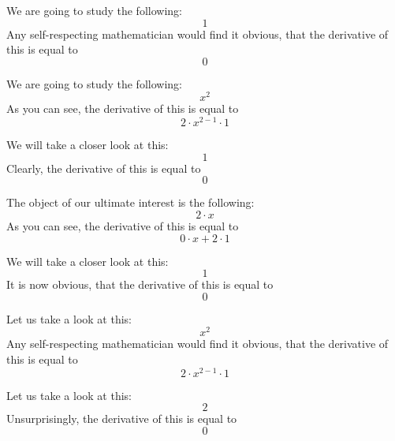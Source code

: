 \documentclass{article}
\begin{document}
We are going to study the following:
\begin{equation}
1 
\end{equation}
Any self-respecting mathematician would find it obvious, that the derivative of this is equal to
\begin{equation}
0 
\end{equation}

We are going to study the following:
\begin{equation}
x ^{2 } 
\end{equation}
As you can see, the derivative of this is equal to
\begin{equation}
2 \cdot x ^{2 - 1 } \cdot 1 
\end{equation}

We will take a closer look at this:
\begin{equation}
1 
\end{equation}
Clearly, the derivative of this is equal to
\begin{equation}
0 
\end{equation}

The object of our ultimate interest is the following:
\begin{equation}
2 \cdot x 
\end{equation}
As you can see, the derivative of this is equal to
\begin{equation}
0 \cdot x + 2 \cdot 1 
\end{equation}

We will take a closer look at this:
\begin{equation}
1 
\end{equation}
It is now obvious, that the derivative of this is equal to
\begin{equation}
0 
\end{equation}

Let us take a look at this:
\begin{equation}
x ^{2 } 
\end{equation}
Any self-respecting mathematician would find it obvious, that the derivative of this is equal to
\begin{equation}
2 \cdot x ^{2 - 1 } \cdot 1 
\end{equation}

Let us take a look at this:
\begin{equation}
2 
\end{equation}
Unsurprisingly, the derivative of this is equal to
\begin{equation}
0 
\end{equation}
\end{document}
